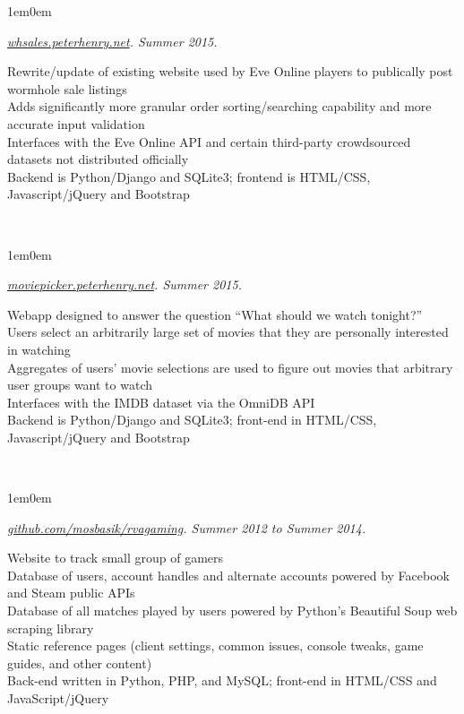 \documentclass[10pt,letterpaper, full]{article}
\newcommand{\pjtitle}[1]{\renewcommand{\givenpjtitle}{#1}}
\newcommand{\pjtime}[1]{\renewcommand{\givenpjtime}{#1}}
\newcommand{\pjbody}[1]{\renewcommand{\givenpjbody}{#1}}
\newcommand{\givenpjtitle}{REQUIRED!}
\newcommand{\givenpjtime}{REQUIRED!}
\newcommand{\givenpjbody}{REQUIRED!}
\newenvironment{projectenv}
    {
        \begin{adjustwidth}{1em}{0em}
    }
    {
        \textit{\givenpjtitle. \givenpjtime.}

        \begin{minipage}[l]{\textwidth}
            \givenpjbody%
        \end{minipage}\\%


        \end{adjustwidth}
    }
\begin{document}
\begin{projectenv}
    \pjtitle{\href{http://whsales.peterhenry.net}{whsales.peterhenry.net}}
    \pjtime{Summer 2015}
    \pjbody{
        Rewrite/update of existing website used by Eve Online players to
        publically post wormhole sale listings\\
        Adds significantly more granular order sorting/searching capability and
        more accurate input validation\\
        Interfaces with the Eve Online API and certain third-party
        crowdsourced datasets not distributed officially\\
        Backend is Python/Django and SQLite3; frontend is HTML/CSS,
        Javascript/jQuery and Bootstrap
    }%
\end{projectenv}%

\begin{projectenv}
    \pjtitle{\href{http://moviepicker.peterhenry.net}{moviepicker.peterhenry.net}}
    \pjtime{Summer 2015}
    \pjbody{
        Webapp designed to answer the question “What should we watch
        tonight?”\\
        Users select an arbitrarily large set of movies that they are
        personally interested in watching\\
        Aggregates of users’ movie selections are used to figure out movies
        that arbitrary user groups want to watch\\
        Interfaces with the IMDB dataset via the OmniDB API\\
        Backend is Python/Django and SQLite3; front-end in HTML/CSS,
        Javascript/jQuery and Bootstrap
    }%
\end{projectenv}%

\begin{projectenv}%
    \pjtitle{\href{https://github.com/mosbasik/rvagaming}{github.com/mosbasik/rvagaming}}
    \pjtime{Summer 2012 to Summer 2014}
    \pjbody{
        Website to track small group of gamers\\
        Database of users, account handles and alternate accounts powered by
        Facebook and Steam public APIs\\
        Database of all matches played by users powered by Python’s Beautiful
        Soup web scraping library\\
        Static reference pages (client settings, common issues, console tweaks,
        game guides, and other content)\\
        Back-end written in Python, PHP, and MySQL; front-end in HTML/CSS and
        JavaScript/jQuery\\
    }%
\end{projectenv}%
\end{document}
